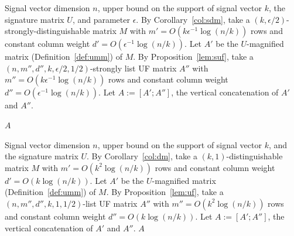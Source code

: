 \documentclass{article}
\begin{document}
\begin{algorithm}[!]
\caption{EDOCS-AA: Sensing matrix}\label{alg:edocsaa}
\begin{algorithmic}[1]
    \Require Signal vector dimension $n$, upper bound on the support of signal vector $k$, the signature matrix $U$, and parameter $\epsilon$.  
    \State By Corollary~\ref{col:sdm}, take a $(k,\epsilon/2)$-strongly-distinguishable matrix $M$ with $m'=O(k\epsilon^{-1}\log(n/k))$ rows and constant column weight $d'=O(\epsilon^{-1}\log(n/k))$. 
    \State Let $A'$ be the $U$-magnified matrix (Definition~\ref{def:umm}) of $M$. 
    \State By Proposition~\ref{lem:suf}, take a $(n,m'',d'',k,\epsilon/2,1/2)$-strongly list UF matrix $A''$ with $m''=O(k\epsilon^{-1}\log(n/k))$ rows and constant column weight $d''=O(\epsilon^{-1}\log(n/k))$. 
    \State Let $A:=[A';A'']$, the vertical concatenation of $A'$ and $A''$. 
     
    \State \Return $A$
\end{algorithmic}
\end{algorithm}

\begin{algorithm}[!]
\caption{EDOCS-AE: Sensing matrix}\label{alg:edocsae}
\begin{algorithmic}[1]
    \Require Signal vector dimension $n$, upper bound on the support of signal vector $k$, and the signature matrix $U$.  
    \State By Corollary~\ref{col:dm}, take a $(k,1)$-distinguishable matrix $M$ with $m'=O(k^2\log(n/k))$ rows and constant column weight $d'=O(k\log(n/k))$. 
    \State Let $A'$ be the $U$-magnified matrix (Definition~\ref{def:umm}) of $M$. 
    \State By Proposition~\ref{lem:uf}, take a $(n,m'',d'',k,1,1/2)$-list UF matrix $A''$ with $m''=O(k^2\log(n/k))$ rows and constant column weight $d''=O(k\log(n/k))$. 
    \State Let $A:=[A';A'']$, the vertical concatenation of $A'$ and $A''$. 
    \State \Return $A$
\end{algorithmic}
\end{algorithm}
\end{document}
